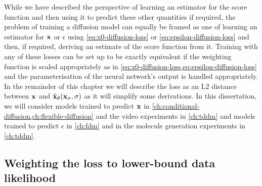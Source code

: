 While we have described the perspective of learning an estimator for the score function and then using it to predict these other quantities if required, the problem of training a diffusion model can equally be framed as one of learning an estimator for ${\mathbf{x}}$ or $\epsilon$ using \cref{eq:x0-diffusion-loss} or \cref{eq:epsilon-diffusion-loss} and then, if required, deriving an estimate of the score function from it. Training with any of these losses can be set up to be exactly equivalent if the weighting function is scaled appropriately as in \cref{eq:x0-diffusion-loss,eq:epsilon-diffusion-loss} and the parameterisation of the neural network's output is handled appropriately. In the remainder of this chapter we will describe the loss as an L2 distance between ${\mathbf{x}}$ and $\hat{{\mathbf{x}}}_\theta({\mathbf{x}}_\sigma, \sigma)$ as it will simplify some derivations. In this dissertation, we will consider models trained to predict ${\mathbf{x}}$ in \cref{ch:conditional-diffusion,ch:flexible-diffusion} and the video experiments in \cref{ch:tddm} and models trained to predict $\epsilon$ in \cref{ch:fdm} and in the molecule generation experiments in \cref{ch:tddm}.

\subsection{Weighting the loss to lower-bound data likelihood} \label{sec:diffusion-likelihood}

